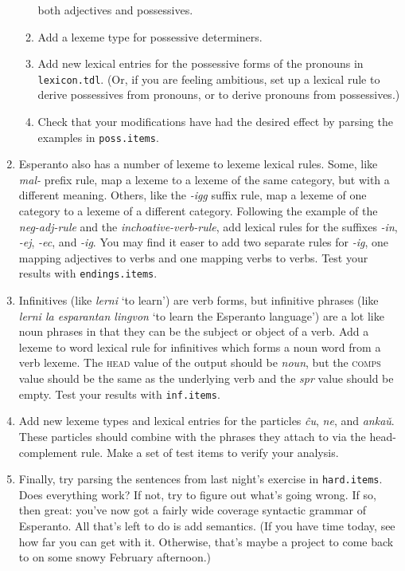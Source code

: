 \documentclass[11pt]{article}
\begin{document}
\begin{enumerate}
\begin{enumerate}
both adjectives and possessives.
\item Add a lexeme type for possessive determiners.
\item Add new lexical entries for the possessive forms of the pronouns in
\texttt{lexicon.tdl}. (Or, if you are feeling ambitious, set up a lexical rule 
to derive possessives from pronouns, or to derive pronouns from possessives.)
\item Check that your modifications have had the desired effect by parsing the 
examples in \texttt{poss.items}.
\end{enumerate}
\item Esperanto also has a number of lexeme to lexeme lexical rules.  Some,
like \emph{mal-} prefix rule, map a lexeme to a lexeme of the same category,
but with a different meaning.  Others, like the \emph{-igg} suffix rule, map a 
lexeme of one category to a lexeme of a different category.  Following the
example of the \emph{neg-adj-rule} and the \emph{inchoative-verb-rule}, add
lexical rules for the suffixes \emph{-in}, \emph{-ej}, \emph{-ec}, and
\emph{-ig}. You may find it easer to add two separate rules for \emph{-ig},
one mapping adjectives to verbs and one mapping verbs to verbs.  Test your
results with \texttt{endings.items}.
\item Infinitives (like \emph{lerni} `to learn') are verb forms, but
infinitive phrases (like \emph{lerni la esparantan lingvon} `to learn the
Esperanto language') are a lot like noun phrases in that they can be the
subject or object of a verb.  Add a lexeme to word lexical rule for
infinitives which forms a noun word from a verb lexeme.  The \textsc{head}
value of the output should be \emph{noun}, but the \textsc{comps} value should 
be the same as the underlying verb and the \emph{spr} value should be empty.
Test your results with \texttt{inf.items}.
\item Add new lexeme types and lexical entries for the particles \emph{\^cu},
\emph{ne}, and \emph{anka\v{u}}.  These particles should combine with the
phrases they attach to via the head-complement rule.  Make a set of test items
to verify your analysis.
\item Finally, try parsing the sentences from last night's exercise in
\texttt{hard.items}.  Does everything work?  If not, try to figure out what's
going wrong.  If so, then great: you've now got a fairly wide coverage
syntactic grammar of Esperanto.  All that's left to do is add semantics.  (If
you have time today, see how far you can get with it.  Otherwise, that's maybe
a project to come back to on some snowy February afternoon.)
\end{enumerate}
\end{document}
